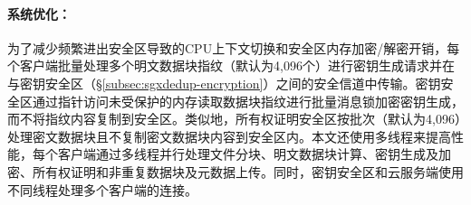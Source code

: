 \paragraph*{系统优化：}为了减少频繁进出安全区导致的CPU上下文切换和安全区内存加密/解密开销，每个客户端批量处理多个明文数据块指纹（默认为4,096个）进行密钥生成请求并在与密钥安全区（\S\ref{subsec:sgxdedup-encryption}）之间的安全信道中传输。密钥安全区通过指针访问未受保护的内存读取数据块指纹进行批量消息锁加密密钥生成，而不将指纹内容复制到安全区\cite{harnik2018SGX}。类似地，所有权证明安全区按批次（默认为4,096）处理密文数据块且不复制密文数据块内容到安全区内。本文还使用多线程来提高性能，每个客户端通过多线程并行处理文件分块、明文数据块计算、密钥生成及加密、所有权证明和非重复数据块及元数据上传。同时，密钥安全区和云服务端使用不同线程处理多个客户端的连接。